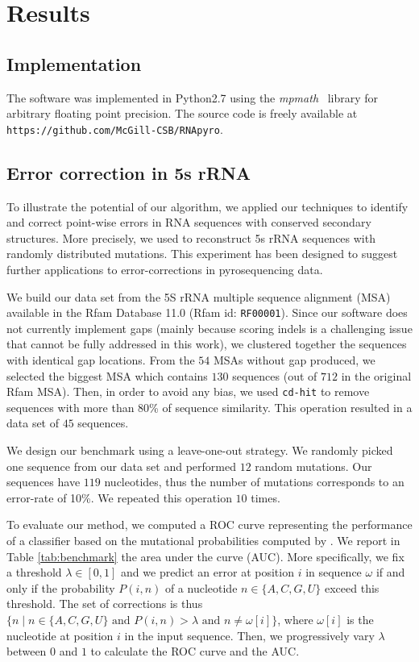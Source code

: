 \section{Results}
\label{sec:results}

\subsection{Implementation}
The software was implemented in Python2.7 using the \textit{mpmath}~\cite{mpmath} library
for  arbitrary floating point precision. The source code is freely available at \verb+https://github.com/McGill-CSB/RNApyro+.



\subsection{Error correction in 5s rRNA}

To illustrate the potential of our algorithm, we applied our techniques to identify and correct point-wise errors in RNA sequences
with conserved secondary structures. More precisely, we used \RNApyro to reconstruct 5s rRNA sequences with randomly distributed
mutations. This experiment has been designed to suggest further applications to error-corrections in pyrosequencing data.

We build our data set from the 5S rRNA multiple sequence alignment (MSA) available in the Rfam Database 11.0 (Rfam id: \texttt{RF00001}).
Since our software does not currently implement gaps (mainly because scoring indels is a challenging issue that cannot be fully addressed
in this work),  we clustered together the sequences with identical gap locations. From the $54$ MSAs without gap produced, we selected the
biggest MSA  which contains $130$ sequences (out of $712$ in the original Rfam MSA). Then, in order to avoid any bias, we used \texttt{cd-hit}
\cite{CDHIT} to remove sequences with more than 80\% of sequence similarity. This operation resulted in a data set of $45$ sequences. 

We design our benchmark using a leave-one-out strategy. We randomly picked one sequence from our data set and performed $12$ random
mutations. Our sequences have $119$ nucleotides, thus the number of mutations corresponds to an error-rate of 10\%. We repeated this operation 
$10$ times. 

To evaluate our method, we computed a ROC curve representing the performance of a classifier based on the mutational probabilities computed by
\RNApyro. We report in Table \ref{tab:benchmark} the area under the curve (AUC). More specifically, we fix a threshold $\lambda \in [0,1]$ and we
predict an error at position $i$ in sequence $\omega$ if and only if the probability $P(i,n)$ of a nucleotide $n \in \{ A,C,G,U \}$ exceed this threshold.
The set of corrections is thus $\{ n \; | \;  n \in \{ A,C,G,U \} \mbox{ and } P(i,n) > \lambda \mbox{ and }  n \neq \omega[i] \}$, where $\omega[i]$ is the
nucleotide at position $i$ in the input sequence. Then, we progressively vary $\lambda$ between $0$ and $1$ to calculate the ROC curve and the AUC.



